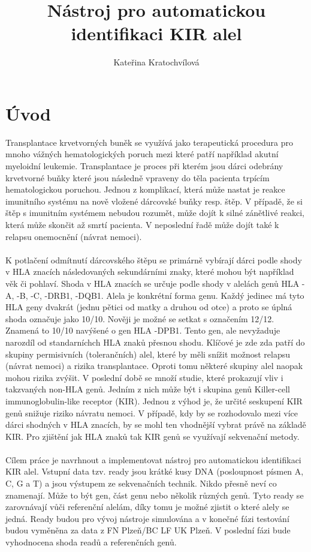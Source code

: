 \documentclass[czech,DP]{thesiskiv}
\author{Kateřina Kratochvílová}
\title{Nástroj pro automatickou identifikaci KIR alel}
\numberwithin{equation}{section}
\begin{document}
%
\maketitle
\tableofcontents

\chapter{Úvod}
Transplantace krvetvorných buněk se využívá jako terapeutická procedura pro mnoho vážných hematologických poruch mezi které patří například akutní myeloidní leukemie. Transplantace je proces při kterém jsou dárci odebrány krvetvorné buňky které jsou následně vpraveny do těla pacienta trpícím hematologickou poruchou. Jednou z komplikací, která může nastat je reakce imunitního systému na nově vložené dárcovské buňky resp. štěp. V případě, že si štěp s imunitním systémem nebudou rozumět, může dojít k silné zánětlivé reakci, která může skončit až smrtí pacienta. V neposlední řadě může dojít také k relapsu onemocnění (návrat nemoci). 
\\
\\
K potlačení odmítnutí dárcovského štěpu se primárně vybírají dárci podle shody v HLA znacích následovaných sekundárními znaky, které mohou být například věk či pohlaví. Shoda v HLA znacích se určuje podle shody v alelách genů HLA -A, -B, -C, -DRB1, -DQB1. Alela je konkrétní forma genu. Každý jedinec má tyto HLA geny dvakrát (jednu pětici od matky a druhou od otce) a proto se úplná shoda označuje jako 10/10. Nověji je možné se setkat s označením 12/12. Znamená to 10/10 navýšené o gen HLA -DPB1. Tento gen, ale nevyžaduje narozdíl od standarníchch HLA znaků přesnou shodu. Klíčové je zde zda patří do skupiny permisivních (tolerančních) alel, které by měli snížit možnost relapsu (návrat nemoci) a rizika transplantace. Oproti tomu některé skupiny alel naopak mohou rizika zvýšit. V poslední době se množí studie, které prokazují vliv i takzvaných non-HLA genů. Jedním z nich může být i skupina genů Killer-cell immunoglobulin-like receptor (KIR). Jednou z výhod je, že určité seskupení KIR genů snižuje riziko návratu nemoci. V případě, kdy by se rozhodovalo mezi více dárci shodných v HLA znacích, by se mohl ten vhodnější vybrat právě na základě KIR. Pro zjištění jak HLA znaků tak KIR genů se využívají sekvenační metody. \cite{KIR_transplantace_jindra} \cite{Frycova_bakalarka} \cite{DPB1_houdova}
\\
\\
Cílem práce je navrhnout a implementovat nástroj pro automatickou identifikaci KIR alel. Vstupní data tzv. ready jsou krátké kusy DNA (posloupnost písmen A, C, G a T) a jsou výstupem ze sekvenačních technik. Nikdo přesně neví co znamenají. Může to být gen, část genu nebo několik různých genů. Tyto ready se zarovnávají vůči referenční alelám, díky tomu je možné zjistit o které alely se jedná. Ready budou pro vývoj nástroje simulována a v konečné fázi testování budou vyměněna za data z FN Plzeň/BC LF UK Plzeň. V poslední fázi bude vyhodnocena shoda readů a referenčních genů.
\end{document}
